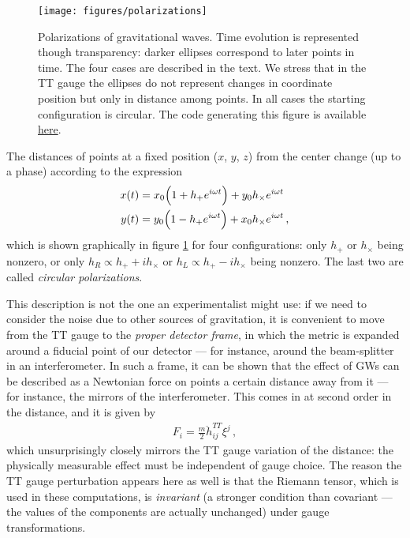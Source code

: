 \documentclass[main.tex]{subfiles}
\begin{document}
\begin{figure}[ht]
\centering
\texttt{[image: figures/polarizations]}
\caption{Polarizations of gravitational waves. Time evolution is represented though transparency: darker ellipses correspond to later points in time. The four cases are described in the text. We stress that in the \ac{TT} gauge the ellipses do not represent changes in coordinate position but only in distance among points. In all cases the starting configuration is circular. The code generating this figure is available \href{https://github.com/jacopok/master-thesis/blob/main/thesis/figures/polarizations.py}{here}.}
\label{fig:polarizations}
\end{figure}

The distances of points at a fixed position (\(x\), \(y\), \(z\)) from the center change (up to a phase) according to the expression 
%
\begin{align}
x (t) &= x_{0} \qty(1 + h_+ e^{i \omega t}) + y_{0} h_\times  e^{i \omega t} \\
y (t) &= y_{0} \qty(1 - h_+ e^{i \omega t}) + x_{0} h_\times  e^{i \omega t} 
\,,
\end{align}
%
which is shown graphically in figure \ref{fig:polarizations} for four configurations: only \(h_+\) or \(h_\times \) being nonzero, or only \(h_R \propto h_+ + i h_\times \) or \(h_L \propto h_+ - i h_\times \) being nonzero. 
The last two are called \emph{circular polarizations}.

This description is not the one an experimentalist might use: if we need to consider the noise due to other sources of gravitation, it is convenient to move from the \ac{TT} gauge to the \emph{proper detector frame}, in which the metric is expanded around a fiducial point of our detector --- for instance, around the beam-splitter in an interferometer.
In such a frame, it can be shown that the effect of \acsp{GW} can be described as a Newtonian force on points a certain distance away from it --- for instance, the mirrors of the interferometer. This comes in at second order in the distance, and it is given by \cite[eq.\ 1.96]{maggioreGravitationalWavesVolume2007}
%
\begin{align}
F_{i} = \frac{m}{2} \ddot{h}_{ij}^{TT} \xi^{j}
\,,
\end{align}
%
which unsurprisingly closely mirrors the \ac{TT} gauge variation of the distance: the physically measurable effect must be independent of gauge choice. 
The reason the \ac{TT} gauge perturbation appears here as well is that the Riemann tensor, which is used in these computations, is \emph{invariant} (a stronger condition than covariant --- the values of the components are actually unchanged) under gauge transformations. 
\end{document}
